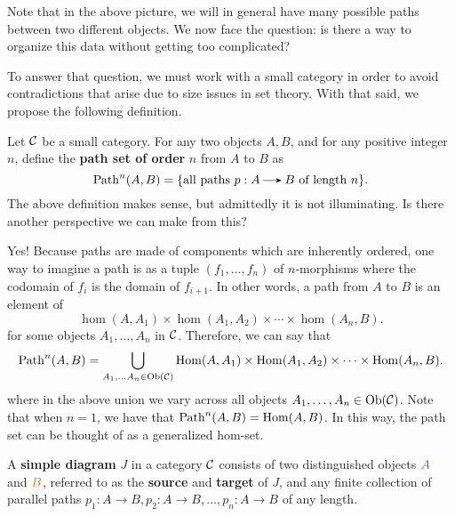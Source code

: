     Note that in the above picture, we will in general have many possible paths 
    between two different objects. We now face the question: is there a way to 
    organize this data without getting too complicated? 

    To answer that question, we must work with a small category in order 
    to avoid contradictions that arise due to size issues in set theory. 
    With that said, we propose the following definition.         
    
    \begin{definition}
        Let $\mathcal{C}$ be a small category. For any two objects $A, B$, 
        and for any positive integer $n$, define the \textbf{path set of order} $n$ 
        from $A$ to $B$ as
        \[
            \path^n(A, B)
            = 
            \{ \text{all paths } p: A \to B \text{ of length } n \}.
        \]
        The above definition makes sense, but admittedly it is not illuminating. 
        Is there another perspective we can make from this? 
    \end{definition}

    Yes! Because paths are made of components which are inherently ordered,
    one way to imagine a path is as a tuple 
    $(f_1, \dots, f_n)$ of $n$-morphisms where the codomain of $f_i$ is the domain of $f_{i+1}$.  
    In other words, a path from $A$ to $B$ is an element of 
    \[
        \hom(A, A_1)\times \hom(A_1, A_2)\times \cdots \times \hom(A_n, B).  
    \]
    for some objects $A_1, \dots, A_n$ in $\mathcal{C}$. Therefore, we can say that 
    \[
        \operatorname{\mathrm{Path}}^n(A,B)
        =
        \bigcup_{A_1, \dots A_n \in \text{Ob}(\mathcal{C})}
        \operatorname{\mathrm{Hom}}(A, A_1)\times \operatorname{\mathrm{Hom}}(A_1, A_2)\times \cdots \times \operatorname{\mathrm{Hom}}(A_n, B).
    \]
    where in the above union we vary across all objects $A_1, \dots, A_n \in \operatorname{\mathrm{Ob}}(\mathcal{C})$. 
    Note that when $n = 1$, we have that $\operatorname{\mathrm{Path}}^n(A, B) = \operatorname{\mathrm{Hom}}(A, B)$. In this way, 
    the path set can be thought of as a generalized hom-set. 



    \begin{definition}
        A \textbf{simple diagram} $J$ in a category $\mathcal{C}$ consists of 
        two distinguished objects 
        $\textcolor{NavyBlue}{A}$ and $\textcolor{Orange}{B}$, referred to as 
        the \textbf{source} and \textbf{target} of $J$, 
        and any finite collection of parallel paths $p_1: A \to B, p_2: A \to B, \dots, p_n: A \to B$ 
        of any length.
    \end{definition}

